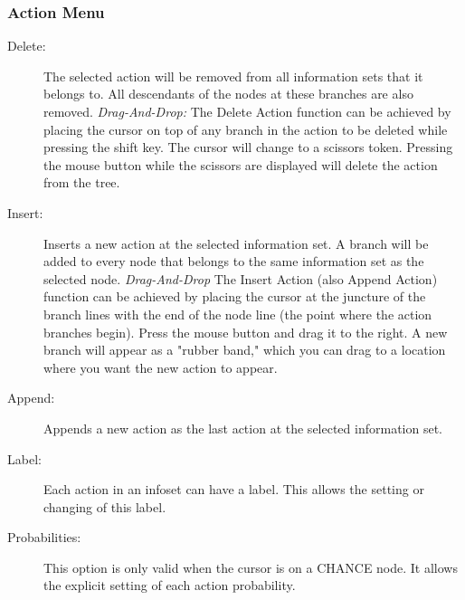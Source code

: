 {\subsubsection{Action Menu}
\begin{description}
\item[Delete:]  The selected action will be removed from all information sets 
that it belongs to.  All descendants of the nodes at these branches are also removed. 
{\em Drag-And-Drop:}  The Delete Action function can be achieved by placing the cursor 
on top of any branch in the action to be deleted while pressing the shift key.  
The cursor will change 
to a scissors token.  Pressing the mouse button while the scissors are displayed 
will delete the action from the tree. 
\item[Insert:]  Inserts a new action at the selected information set.  A branch 
will be added to every node that belongs to the same information set as the 
selected node. 
{\em Drag-And-Drop}  The Insert Action (also Append Action) function 
can be achieved by 
placing the cursor at the juncture of the branch lines with the end of the node 
line (the point where the action branches begin).  Press the mouse button and drag 
it to the right.  A new branch will appear as a "rubber band,"  which you can drag 
to a location where you want the new action to appear.   
\item[Append:]  Appends a new action as the last action at the selected 
information set.  
\item[Label:]  Each action in an infoset can have a label. 
This allows the setting or changing of this label. 
\item[Probabilities:]  This option is only valid when the cursor is on a
CHANCE node.  It allows the explicit setting of each action probability.
\end{description}

}
